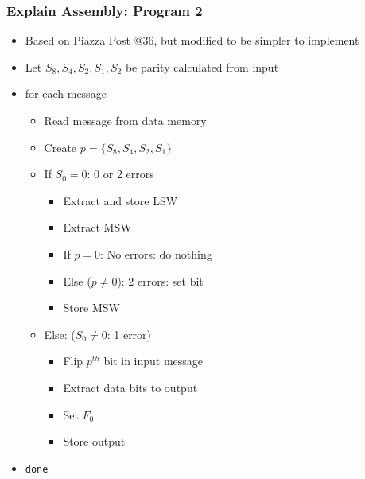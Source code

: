 	\begin{frame}
		\frametitle{Explain Assembly: Program 2}
		\begin{itemize}
			\item Based on Piazza Post @36, but modified to be simpler to implement
			\item Let $S_8, S_4, S_2, S_1, S_2$ be parity calculated from input
			\item for each message
				\begin{itemize}
					\item Read message from data memory
					\item Create $p=\{S_8, S_4, S_2, S_1\}$
					\item If $S_0 = 0$: 0 or 2 errors
						\begin{itemize}
							\item Extract and store LSW
							\item Extract MSW
							\item If $p = 0$: No errors: do nothing
							\item Else ($p \neq  0$): 2 errors: set bit
							\item Store MSW
						\end{itemize}
					\item Else: ($S_0 \neq 0$: 1 error)
						\begin{itemize}
							\item Flip $p^{th}$ bit in input message
							\item Extract data bits to output
							\item Set $F_0$
							\item Store output
						\end{itemize}
				\end{itemize}
			\item \texttt{done}
		\end{itemize}
	\end{frame}

